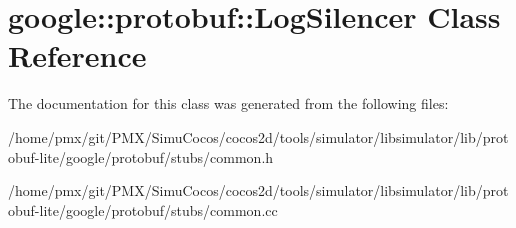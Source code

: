 \hypertarget{classgoogle_1_1protobuf_1_1LogSilencer}{}\section{google\+:\+:protobuf\+:\+:Log\+Silencer Class Reference}
\label{classgoogle_1_1protobuf_1_1LogSilencer}


The documentation for this class was generated from the following files\+:\begin{DoxyCompactItemize}
\item 
/home/pmx/git/\+P\+M\+X/\+Simu\+Cocos/cocos2d/tools/simulator/libsimulator/lib/protobuf-\/lite/google/protobuf/stubs/common.\+h\item 
/home/pmx/git/\+P\+M\+X/\+Simu\+Cocos/cocos2d/tools/simulator/libsimulator/lib/protobuf-\/lite/google/protobuf/stubs/common.\+cc\end{DoxyCompactItemize}
